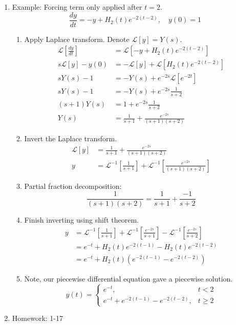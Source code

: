 \documentclass{article}
\begin{document}
\begin{enumerate}
\item Example: Forcing term only applied after $t=2$. 
\[
\frac{dy}{dt} = -y+H_2(t)e^{-2(t-2)}, \quad y(0)=1
\]
\begin{enumerate}
\item Apply Laplace transform. Denote $\mathcal{L}[y]=Y(s)$.
\begin{align*}
\mathcal{L}[\frac{dy}{dt}] &= \mathcal{L}[-y+H_2(t)e^{-2(t-2)}] \\
s\mathcal{L}[y]-y(0) &= -\mathcal{L}[y]+\mathcal{L}[H_2(t)e^{-2(t-2)}] \\
sY(s)-1 &= -Y(s)+e^{-2s}\mathcal{L}[e^{-2t}] \\
sY(s)-1 &= -Y(s)+e^{-2s}\frac{1}{s+2} \\
(s+1)Y(s)&= 1+e^{-2s}\frac{1}{s+2} \\
Y(s)&= \frac{1}{s+1}+\frac{e^{-2s}}{(s+1)(s+2)}
\end{align*}
\item Invert the Laplace transform.
\begin{align*}
\mathcal{L}[y] &= \frac{1}{s+1}+\frac{e^{-2s}}{(s+1)(s+2)} \\
y &= \mathcal{L}^{-1}[\frac{1}{s+1}]+\mathcal{L}^{-1}[\frac{e^{-2s}}{(s+1)(s+2)}] 
\end{align*}
\item Partial fraction decomposition:
\[
\frac{1}{(s+1)(s+2)} = \frac{1}{s+1}+\frac{-1}{s+2}
\]
\item Finish inverting using shift theorem.
\begin{align*}
y &= \mathcal{L}^{-1}[\frac{1}{s+1}]+\mathcal{L}^{-1}[\frac{e^{-2s}}{s+1}]-\mathcal{L}^{-1}[\frac{e^{-2s}}{s+2}] \\
&= e^{-t}+H_2(t)e^{-2(t-1)}-H_2(t)e^{-2(t-2)}  \\
&= e^{-t}+H_2(t)(e^{-2(t-1)}-e^{-2(t-2)} )
\end{align*}
\item Note, our piecewise differential equation gave a piecewise solution.
\[
y(t) = \begin{cases}
e^{-t}, & t<2 \\
e^{-t}+e^{-2(t-1)}-e^{-2(t-2)} , & t\geq 2
\end{cases}
\]
\end{enumerate}

\item Homework: 1-17


\end{enumerate}
\end{document}
